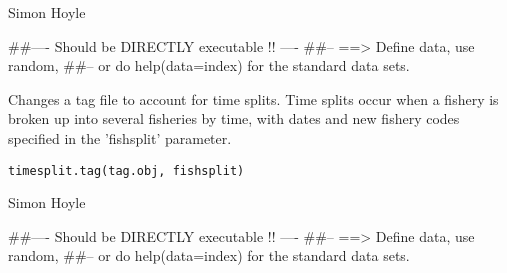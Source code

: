 \documentclass[a4paper]{book}
\begin{document}
%
\begin{Author}\relax

Simon Hoyle
\end{Author}
%
\begin{Examples}
\begin{ExampleCode}
##---- Should be DIRECTLY executable !! ----
##-- ==>  Define data, use random,
##--	or do  help(data=index)  for the standard data sets.

\end{ExampleCode}
\end{Examples}
%
\begin{Description}\relax

Changes a tag file to account for time splits. 
Time splits occur when a fishery is broken up into several fisheries by time, with dates and new fishery codes specified in the 'fishsplit' parameter. 
\end{Description}
%
\begin{Usage}
\begin{verbatim}
timesplit.tag(tag.obj, fishsplit)
\end{verbatim}
\end{Usage}
%
\begin{Arguments}
\begin{ldescription}
\item[\code{tag.obj}] 


\item[\code{fishsplit}] 


\end{ldescription}
\end{Arguments}
%
\begin{Author}\relax

Simon Hoyle
\end{Author}
%
\begin{Examples}
\begin{ExampleCode}
##---- Should be DIRECTLY executable !! ----
##-- ==>  Define data, use random,
##--	or do  help(data=index)  for the standard data sets.

\end{ExampleCode}
\end{Examples}
\end{document}
